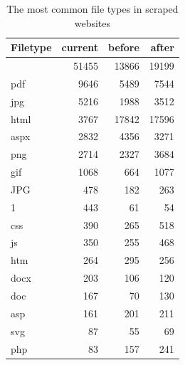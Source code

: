 \documentclass[11pt]{article}
\begin{document}
\begin{table}[ht]
	\centering
	\begin{tabular}{lrrr}
		\hline
		Filetype & current & before & after \\ 
		\hline
		& 51455 & 13866 & 19199 \\ 
		pdf & 9646 & 5489 & 7544 \\ 
		jpg & 5216 & 1988 & 3512 \\ 
		html & 3767 & 17842 & 17596 \\ 
		aspx & 2832 & 4356 & 3271 \\ 
		png & 2714 & 2327 & 3684 \\ 
		gif & 1068 & 664 & 1077 \\ 
		JPG & 478 & 182 & 263 \\ 
		1 & 443 &  61 &  54 \\ 
		css & 390 & 265 & 518 \\ 
		js & 350 & 255 & 468 \\ 
		htm & 264 & 295 & 256 \\ 
		docx & 203 & 106 & 120 \\ 
		doc & 167 &  70 & 130 \\ 
		asp & 161 & 201 & 211 \\ 
		svg &  87 &  55 &  69 \\ 
		php &  83 & 157 & 241 \\ 
		\hline
	\end{tabular}
	\caption{The most common file types in scraped websites} 
\end{table}
\end{document}
